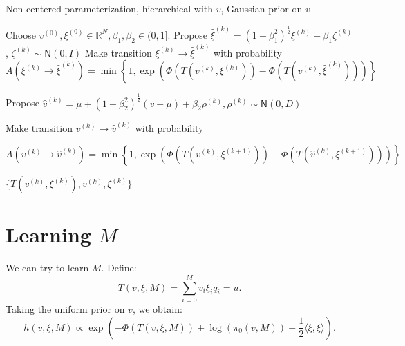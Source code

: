 \documentclass{siamart1116}
\begin{document}
    \begin{algorithm}
    \caption{Non-centered parameterization, hierarchical with $v$, Gaussian prior on $v$}
    \label{alg:hier_v_gaussian}
    \begin{algorithmic}
    \State Choose $v^{(0)}, \xi^{(0)} \in \mathbb{R}^N, \beta_1, \beta_2 \in (0, 1]$.
    \State Propose $\hat\xi^{(k)} = (1-\beta_1^2)^{\frac{1}{2}}\xi^{(k)} + \beta_1 \zeta^{(k)}$, $\zeta^{(k)} \sim \mathsf{N}(0, I)$
    \State Make transition $\xi^{(k)} \to \hat\xi^{(k)}$ with probability
    \[ A(\xi^{(k)} \to \hat\xi^{(k)}) = \min\left\{1, \exp\left(\Phi(T(v^{(k)}, \xi^{(k)})) - \Phi(T(v^{(k)}, \hat \xi^{(k)}))\right) \right\}\]

    \State Propose $\hat v^{(k)} = \mu + (1-\beta_2^2)^{\frac{1}{2}}(v-\mu) + \beta_2 \rho^{(k)}, \rho^{(k)} \sim \mathsf{N}(0,D)$

    \State Make transition $v^{(k)} \to \hat v^{(k)}$ with probability
    
    \[ A(v^{(k)} \to \hat v^{(k)}) = \min\left\{1, \exp\left(\Phi(T(v^{(k)}, \xi^{(k+1)}))-\Phi(T(\hat v^{(k)}, \xi^{(k+1)})) \right) \right\} \]
     

    \EndFor
    \State \Return $\{ T(v^{(k)},\xi^{(k)}), v^{(k)}, \xi^{(k)} \}$
    \end{algorithmic}
    \end{algorithm}

\section{Learning $M$}
    We can try to learn $M$. Define:
    \begin{equation}
    \label{eqn:v_M_T}
    T(v,\xi,M) = \sum_{i=0}^{M} v_i\xi_iq_i = u.
    \end{equation}
    Taking the uniform prior on $v$, we obtain:
    \begin{equation}
    \label{eqn:learn_v_M_posterior}
    h(v, \xi, M) \propto \exp \left(-\Phi(T(v,\xi, M)) + \log (\pi_0(v, M)) - \frac{1}{2}\langle \xi, \xi \rangle  \right).
    \end{equation}
\end{document}
